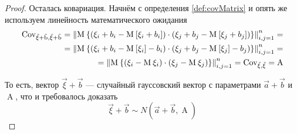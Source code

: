 \begin{proof}
    Осталась ковариация. Начнём с определения \ref{def:covMatrix} и опять же
    используем линейность математического ожидания
    \begin{align*}
        \operatorname{Cov_{\vec{\xi} + \vec{b}, \vec{\xi} + \vec{b}}}
        = \left\| \operatorname{M}_{} 
            \left\{ \left( \xi_i + b_i - \operatorname{M}_{} \left[ \xi_i + b_i \right] \right)
                \cdot \left( \xi_j + b_j - \operatorname{M}_{} \left[ \xi_j + b_j \right] \right)
            \right\} \right\|_{i,j=1}^n = \\
        = \left\| \operatorname{M}_{} 
            \left\{ \left( \xi_i + b_i - \operatorname{M}_{} \left[ \xi_i \right] - b_i \right)
                \cdot \left( \xi_j + b_j - \operatorname{M}_{} \left[ \xi_j \right] - b_j \right)
            \right\} \right\|_{i,j=1}^n = \\
        = \left\| \operatorname{M}_{} 
            \left\{ \left( \xi_i - \operatorname{M}_{} \xi_i \right)
                \cdot \left( \xi_j - \operatorname{M}_{} \xi_j \right)
            \right\} \right\|_{i,j=1}^n
        = \operatorname{Cov_{\vec{\xi}, \vec{\xi}}} = \operatorname{A}
    \end{align*}

    То есть, вектор $\vec{\xi} + \vec{b}$ --- случайный гауссовский вектор с
    параметрами $\vec{a} + \vec{b}$ и $\operatorname{A}$, что и требовалось доказать
    $$\vec{\xi} + \vec{b} \sim N\left( \vec{a} + \vec{b}, \operatorname{A} \right)$$
\end{proof}

